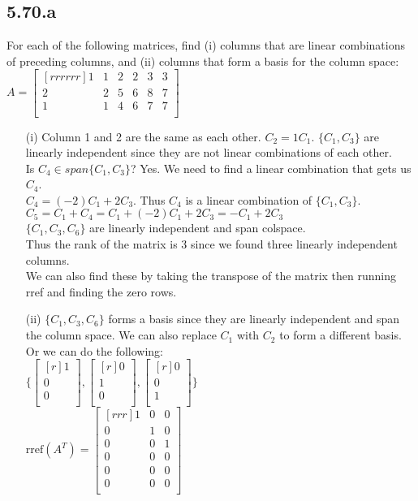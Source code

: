 \documentclass{report}
\theoremstyle{plain}
\theoremstyle{definition}
\theoremstyle{plain}
\begin{document}
\subsection{5.70.a}
For each of the following matrices, find (i) columns that are linear combinations of preceding columns, and (ii) columns that form a basis for the column space:\\	
$A=\begin{bmatrix}[rrrrrr]1&1&2&2&3&3\\2&2&5&6&8&7\\1&1&4&6&7&7\\\end{bmatrix}$
		\begin{enumerate}
		\item[(i)] Column 1 and 2 are the same as each other. $C_2 = 1C_1$. $\{C_1,C_3\}$ are linearly independent since they are not linear combinations of each other.\\
		Is $C_4 \in span\{C_1,C_3\}$? Yes. We need to find a linear combination that gets us $C_4$.\\
		$C_4 = (-2)C_1 + 2C_3$. Thus $C_4$ is a linear combination of $\{C_1,C_3\}$.\\
		$C_5 = C_1+C_4 = C_1+(-2)C_1+2C_3 = -C_1+2C_3$\\
		$\{C_1,C_3,C_6\}$ are linearly independent and span colspace.\\
		Thus the rank of the matrix is 3 since we found three linearly independent columns.\\
		We can also find these by taking the transpose of the matrix then running rref and finding the zero rows. 
		\item[(ii)] 	$\{C_1,C_3,C_6\}$ forms a basis since they are linearly independent and span the column space. We can also replace $C_1$ with $C_2$ to form a different basis. Or we can do the following:\\
		$\{\begin{bmatrix}[r]1\\0\\0\\\end{bmatrix},\begin{bmatrix}[r]0\\1\\0\\\end{bmatrix},\begin{bmatrix}[r]0\\0\\1\\\end{bmatrix}\}$\\
		$\mathrm{rref}(A^T)=\begin{bmatrix}[rrr]1&0&0\\0&1&0\\0&0&1\\0&0&0\\0&0&0\\0&0&0\\\end{bmatrix}$\\		
		\end{enumerate}
		
\end{document}
